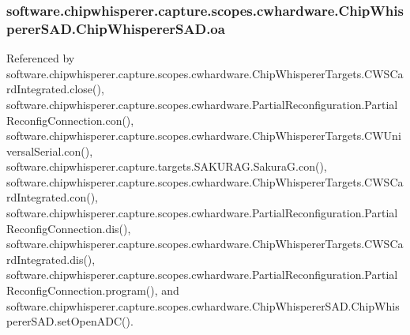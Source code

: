 \subsubsection[{oa}]{\setlength{\rightskip}{0pt plus 5cm}software.\+chipwhisperer.\+capture.\+scopes.\+cwhardware.\+Chip\+Whisperer\+S\+A\+D.\+Chip\+Whisperer\+S\+A\+D.\+oa}\label{classsoftware_1_1chipwhisperer_1_1capture_1_1scopes_1_1cwhardware_1_1ChipWhispererSAD_1_1ChipWhispererSAD_a3544050360814da040141bfe7a63a772}


Referenced by software.\+chipwhisperer.\+capture.\+scopes.\+cwhardware.\+Chip\+Whisperer\+Targets.\+C\+W\+S\+Card\+Integrated.\+close(), software.\+chipwhisperer.\+capture.\+scopes.\+cwhardware.\+Partial\+Reconfiguration.\+Partial\+Reconfig\+Connection.\+con(), software.\+chipwhisperer.\+capture.\+scopes.\+cwhardware.\+Chip\+Whisperer\+Targets.\+C\+W\+Universal\+Serial.\+con(), software.\+chipwhisperer.\+capture.\+targets.\+S\+A\+K\+U\+R\+A\+G.\+Sakura\+G.\+con(), software.\+chipwhisperer.\+capture.\+scopes.\+cwhardware.\+Chip\+Whisperer\+Targets.\+C\+W\+S\+Card\+Integrated.\+con(), software.\+chipwhisperer.\+capture.\+scopes.\+cwhardware.\+Partial\+Reconfiguration.\+Partial\+Reconfig\+Connection.\+dis(), software.\+chipwhisperer.\+capture.\+scopes.\+cwhardware.\+Chip\+Whisperer\+Targets.\+C\+W\+S\+Card\+Integrated.\+dis(), software.\+chipwhisperer.\+capture.\+scopes.\+cwhardware.\+Partial\+Reconfiguration.\+Partial\+Reconfig\+Connection.\+program(), and software.\+chipwhisperer.\+capture.\+scopes.\+cwhardware.\+Chip\+Whisperer\+S\+A\+D.\+Chip\+Whisperer\+S\+A\+D.\+set\+Open\+A\+D\+C().

\hypertarget{classsoftware_1_1chipwhisperer_1_1capture_1_1scopes_1_1cwhardware_1_1ChipWhispererSAD_1_1ChipWhispererSAD_ad1dd4a1e378e8431b34541706f1c52a0}{}
